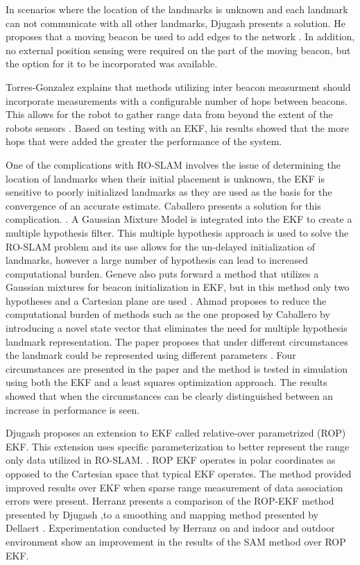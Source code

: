 \documentclass[conference]{IEEEtran}
\begin{document}
In scenarios where the location of the landmarks is unknown and each landmark can not communicate with all other landmarks, Djugash presents a solution. He proposes that a moving beacon be used to add edges to the network \cite{Djugash2006}. In addition, no external position sensing were required on the part of the moving beacon, but the option for it to be incorporated was available. 

Torres-Gonzalez explains that methods utilizing inter beacon measurment should incorporate measurements with a configurable number of hops between beacons. This allows for the robot to gather range data from beyond the extent of the robots sensors \cite{Torres-Gonzalez2015}. Based on testing with an EKF, his results showed that the more hops that were added the greater the performance of the system. 



One of the complications with RO-SLAM involves the issue of determining the location of landmarks when their initial placement is unknown, the EKF is sensitive to poorly initialized landmarks as they are used as the basis for the convergence of an accurate estimate. Caballero presents a solution for this complication. \cite{Caballero2010}. A Gaussian Mixture Model is integrated into the EKF to create a multiple hypothesis filter.  This multiple hypothesis approach is used to solve the RO-SLAM problem and its use allows for the un-delayed initialization of landmarks, however a large number of hypothesis can lead to increased computational burden. Geneve
 also puts forward a method that utilizes a Gaussian mixtures for beacon initialization in EKF, but in this method only two hypotheses and a Cartesian plane are used \cite{Geneve2015}.  Ahmad proposes to reduce the computational burden of methods such as the one proposed by Caballero \cite{Caballero2010} by introducing a novel state vector that eliminates the need for multiple hypothesis landmark representation. The paper proposes that under different circumstances the landmark could be represented using different parameters  \cite{Ahmad2011a}. Four circumstances are presented in the paper and the method is tested in simulation using both the EKF and a least squares optimization approach. The results showed that when the circumstances can be clearly distinguished between an increase in performance is seen.


Djugash proposes an extension to EKF called relative-over parametrized (ROP) EKF. This extension uses specific parameterization to  better represent the range only data utilized in RO-SLAM. \cite{Djugash2008}. ROP EKF operates in polar coordinates as opposed to the Cartesian space that typical EKF operates. The method provided improved results over EKF when sparse range measurement of data association errors were present. Herranz presents a comparison of the ROP-EKF method presented by Djugash \cite{Djugash2008},to a smoothing and mapping method presented by Dellaert \cite{Dellaert2006}. Experimentation conducted by Herranz on and indoor and outdoor environment show an improvement in the results of the SAM method over ROP EKF. \cite{Herranz2014}
\end{document}
